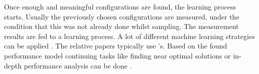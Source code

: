 Once enough and meaningful configurations are found, the learning process starts. Usually the previously chosen configurations are measured, under the condition that this was not already done whilst sampling. The measurement results are fed to a learning process. A lot of different machine learning strategies can be applied \cite{VAMOSConference}. The relative papers typically use \CART's. Based on the found performance model continuing tasks like finding near optimal solutions or in-depth performance analysis can be done \cite{VAMOSConference}.


%








